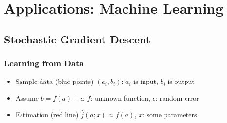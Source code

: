 \section{Applications: Machine Learning}

\subsection{Stochastic Gradient Descent}

\subsubsection*{Learning from Data}
\begin{itemize}
    \item Sample data (blue points) $(a_i, b_i)$: $a_i$ is input, $b_i$ is output
    \item Assume $b=f(a)+\epsilon$; $f$: unknown function, $\epsilon$: random error
    \item Estimation (red line) $\hat{f}(a;x)\approx f(a)$, $x$: some parameters
\end{itemize}
\begin{figures}
\end{figures}

